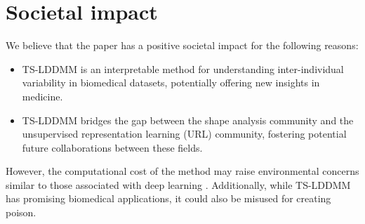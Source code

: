 



\section{Societal impact}
\label{appendix:societal_impact}
We believe that the paper has a positive societal impact for the following reasons:
\begin{itemize}
\item TS-LDDMM is an interpretable method for understanding inter-individual variability in biomedical datasets, potentially offering new insights in medicine.
\item TS-LDDMM bridges the gap between the shape analysis community and the unsupervised representation learning (URL) community, fostering potential future collaborations between these fields.
\end{itemize}
However, the computational cost of the method may raise environmental concerns similar to those associated with deep learning \cite{oh2024stable}.
 Additionally, while TS-LDDMM has promising biomedical applications, it could also be misused for creating poison.
